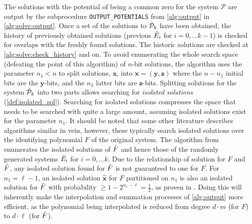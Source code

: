 The solutions with the potential of being a common zero for the system $\mathcal{P}$ are output by the subprocedure \texttt{OUTPUT\_POTENTIALS} from \cref{alg:output} in \cref{alg:solve:output}. Once a set of the solutions to $\Tilde{\mathcal{P}}_k$ have been obtained, the history of previously obtained solutions (previous $\Tilde{E}_i$ for $i = 0, \dots k - 1$) is checked for overlaps with the freshly found solutions. The historic solutions are checked at \cref{alg:solve:check_history} and on. To avoid enumerating the whole search space (defeating the point of this algorithm) of $n$-bit solutions, the algorithm uses the parameter $n_1 < n$ to split solutions, $\mathbf{x}$, into $\mathbf{x} = (\mathbf{y}, \mathbf{z})$ where the $n - n_1$ initial bits are the $\mathbf{y}$-bits, and the $n_1$ latter bits are $\mathbf{z}$-bits. Splitting solutions for the system $\Tilde{\mathcal{P}}_k$ into two parts allows searching for \textit{isolated solutions} (\cref{def:isolated_sol}). Searching for isolated solutions compresses the space that needs to be searched with quite a large amount, assuming isolated solutions exist for the parameter $n_1$. It should be noted that some other literature describes algorithms similar in vein, however, these typically search isolated solutions over the identifying polynomial $F$ of the original system. The algorithm from \cite{cryptoeprint:2021/578} enumerates the isolated solutions of $\Tilde{F}$ and hence those of the randomly generated systems $\Tilde{E}_i$ for $i = 0, \dots k$. Due to the relationship of solution for $F$ and $\Tilde{F}$, any isolated solution found for $\Tilde{F}$ is not guaranteed to one for $F$. For $n_1 = \ell - 1$, an isolated solution $\hat{\mathbf{x}}$ for $F$ partitioned on $n_1$ is also an isolated solution for $\Tilde{F}$ with probability $\geq 1 - 2^{n_1 - \ell} = \frac{1}{2}$, as proven in \cite{cryptoeprint:2021/578}. Doing this will inherently make the interpolation and summation processes of \cref{alg:output} more efficient, as the polynomial being interpolated is reduced from degree $d \cdot m$ (for $F$) to $d \cdot \ell$ (for $\Tilde{F}$).

